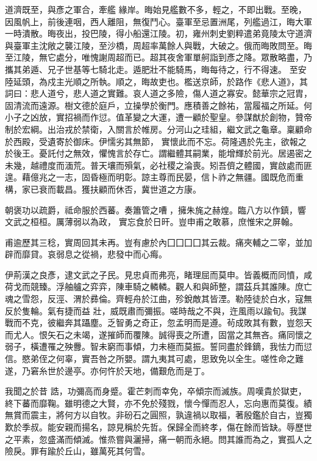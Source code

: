 \begin{pinyinscope}
 道濟既至，與彥之軍合，牽艦
 緣岸。晦始見艦數不多，輕之，不即出戰。至晚，因風帆上，前後連咽，西人離阻，無復鬥心。臺軍至忌置洲尾，列艦過江，晦大軍一時潰散。晦夜出，投巴陵，得小船還江陵。初，雍州刺史劉粹遣弟竟陵太守道濟與臺軍主沈敞之襲江陵，至沙橋，周超率萬餘人與戰，大破之。俄而晦敗問至。晦至江陵，無它處分，唯愧謝周超而已。超其夜舍軍單舸詣到彥之降。眾散略盡，乃攜其弟遁、兄子世基等七騎北走。遁肥壯不能騎馬，晦每待之，行不得速。
 至安陸延頭，為戍主光順之所執。順之，晦故吏也。檻送京師，於路作《悲人道》，其詞曰：悲人道兮，悲人道之實難。哀人道之多險，傷人道之寡安。懿華宗之冠胄，固清流而遠源。樹文德於庭戶，立操學於衡門。應積善之餘祐，當履福之所延。何小子之凶放，實招禍而作愆。值革變之大運，遭一顧於聖皇。參謀猷於創物，贊帝制於宏綱。出治戎於禁衛，入關言於帷房。分河山之珪組，繼文武之龜章。稟顧命於西殿，受遺寄於御床。伊懦劣其無節，
 實懷此而不忘。荷隆遇於先主，欲報之於後王。憂託付之無效，懼愧言於存亡。謂繼體其嗣業，能增輝於前光。居遏密之未幾，越禮度而湎荒。普天壤而殞氣，必社稷之淪喪。矧吾儕之體國，實啟處而匪遑。藉億兆之一志，固昏極而明彰。諒主尊而民晏，信卜祚之無疆。國既危而重構，家已衰而載昌。獲扶顧而休否，冀世道之方康。



 朝褒功以疏爵，祗命服於西蕃。奏簫管之嘈𡂐，擁朱旄之赫煌。臨八方以作鎮，響文武之桓桓。厲薄弱以為政，
 實忘食於日旰。豈申甫之敢慕，庶惟宋之屏翰。



 甫逾歷其三稔，實周回其未再。豈有慮於內囗囗囗囗其云裁。痛夾輔之二宰，並加辟而靡貸。哀弱息之從禍，悲發中而心痗。



 伊荊漢之良彥，逮文武之子民。見忠貞而弗亮，睹理屈而莫申。皆義概而同憤，咸荷戈而競臻。浮舳艫之弈弈，陳車騎之轔轔。觀人和與師整，謂茲兵其誰陳。庶亡魂之雪怨，反涇、渭於彞倫。齊輕舟於江曲，殄銳敵其皆湮。勒陸徒於白水，寇無反於隻輪。氣有捷而益
 壯，威既肅而彌振。嗟時哉之不與，迕風雨以踰旬。我謀戰而不克，彼繼奔其躡塵。乏智勇之奇正，忽孟明而是遵。茍成敗其有數，豈怨天而尤人。恨矢石之未竭，遂摧師而覆陳。誠得喪之所遭，固當之其無吝。痛同懷之弱子，橫遭罹之殃釁。智未窮而事傾，力未極而莫振。誓同盡於鋒鏑，我怯力而愆信。愍弟侄之何辜，實吾咎之所嬰。謂九夷其可處，思致免以全生。嗟性命之難遂，乃窘糸世於邊亭。亦何忤於天地，備艱危而是丁。



 我聞之於昔
 誥，功彌高而身蹙。霍芒刺而幸免，卒傾宗而滅族。周嘆貴於獄吏，終下蕃而靡鞠。雖明德之大賢，亦不免於殘戮，懷今憚而忍人，忘向惠而莫復。績無賞而震主，將何方以自牧。非砏石之圓照，孰違禍以取福，著殷鑑於自古，豈獨歎於季叔。能安親而揚名，諒見稱於先哲。保歸全而終孝，傷在餘而皆缺。辱歷世之平素，忽盛滿而傾滅。惟烝嘗與灑掃，痛一朝而永絕。問其誰而為之，實孤人之險戾。罪有踰於丘山，雖萬死其何雪。




\end{pinyinscope}
